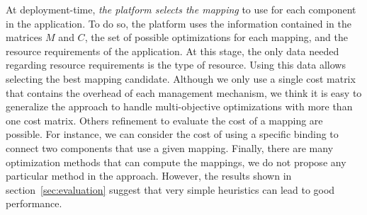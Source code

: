At deployment-time, \textit{the platform selects the mapping} to use for each component in the application. %
To do so, the platform uses the information contained in the matrices $ M $ and $ C $, the set of possible optimizations for each mapping, and the resource requirements of the application.
At this stage, the only data needed regarding resource requirements is the type of resource.
Using this data allows selecting the best mapping candidate.
Although we only use a single cost matrix that contains the overhead of each management mechanism, we think it is easy to generalize the approach to handle multi-objective optimizations with more than one cost matrix.
Others refinement to evaluate the cost of a mapping are possible.
For instance, we can consider the cost of using a specific binding to connect two components that use a given mapping.
Finally, there are many optimization methods that can compute the mappings, we do not propose any particular method in the approach.
However, the results shown in section~\ref{sec:evaluation} suggest that very simple heuristics can lead to good performance. 
 

